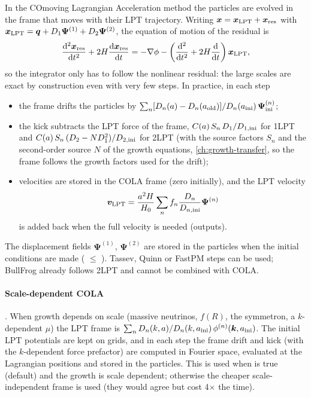 In the COmoving Lagrangian Acceleration method \cite{Tassev2013} the particles are evolved in the frame that moves
with their LPT trajectory. Writing $\bm{x}=\bm{x}_{\rm LPT}+\bm{x}_{\rm res}$ with
$\bm{x}_{\rm LPT}=\bm{q}+D_1\bm\Psi^{(1)}+D_2\bm\Psi^{(2)}$, the equation of motion of the residual is
\begin{equation}
\frac{\mathrm{d}^2\bm{x}_{\rm res}}{\mathrm{d} t^2}+2H\frac{\mathrm{d}\bm{x}_{\rm res}}{\mathrm{d} t}=-\nabla\phi-\left(\frac{\mathrm{d}^2}{\mathrm{d} t^2}+
2H\frac{\mathrm{d}}{\mathrm{d} t}\right)\bm{x}_{\rm LPT},
\end{equation}
so the integrator only has to follow the nonlinear residual: the large scales are exact by construction even with
very few steps. In practice, in each step
\begin{itemize}
\item the frame drifts the particles by $\sum_n[D_n(a)-D_n(a_{\rm old})]/D_n(a_{\rm ini})\,\bm\Psi^{(n)}_{\rm ini}$;
\item the kick subtracts the LPT force of the frame, $C(a)\,S_n\,D_1/D_{1,\rm ini}$ for 1LPT and
      $C(a)\,S_n\,(D_2-N D_1^2)/D_{2,\rm ini}$ for 2LPT (with the source factors $S_n$ and the second-order source $N$
      of the growth equations, \cref{ch:growth-transfer}, so the frame follows the growth factors used for the drift);
\item velocities are stored in the COLA frame (zero initially), and the LPT velocity
      \[\bm v_{\rm LPT}=\frac{a^2H}{H_0}\sum_nf_n\frac{D_n}{D_{n,\rm ini}}\bm\Psi^{(n)}\]
      is added back when the full velocity is needed (outputs).
\end{itemize}
The displacement fields $\bm\Psi^{(1)}$, $\bm\Psi^{(2)}$ are stored in the particles when the initial conditions are
made ( $\le$ ). Tassev, Quinn or FastPM steps can be used; BullFrog
already follows 2LPT and cannot be combined with COLA.

\paragraph*{Scale-dependent COLA} \cite{Winther2017}. When growth depends on scale (massive neutrinos, $f(R)$, the
symmetron, a $k$-dependent $\mu$) the LPT frame is $\sum_nD_n(k,a)/D_n(k,a_{\rm ini})\,\phi^{(n)}(\bm{k},a_{\rm ini})$. The
initial LPT potentials are kept on grids, and in each step the frame drift and kick (with the $k$-dependent force
prefactor) are computed in Fourier space, evaluated at the Lagrangian positions and stored in the particles. This
is used when  is true (default) and the growth is scale dependent; otherwise
the cheaper scale-independent frame is used (they would agree but cost 4$\times$ the time).


